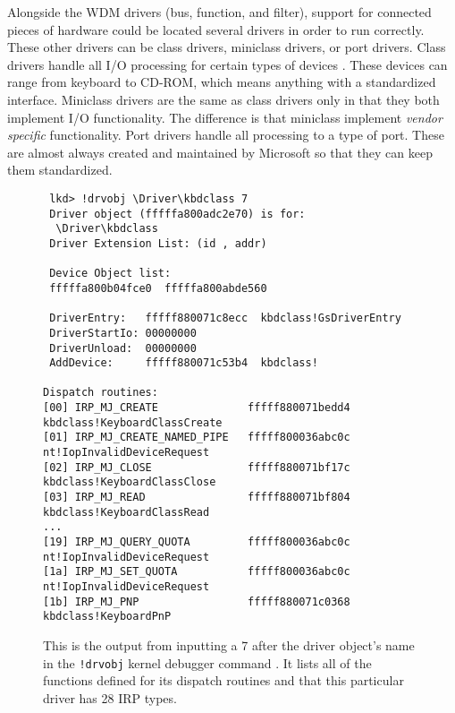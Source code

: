 \documentclass[10pt,draftclsnofoot,onecolumn]{IEEEtran}
\begin{document}
\par Alongside the WDM drivers (bus, function, and filter), support for connected pieces of hardware could be located several drivers in order to run correctly.
These other drivers can be class drivers, miniclass drivers, or port drivers.
Class drivers handle all I/O processing for certain types of devices \cite{win:2}.
These devices can range from keyboard to CD-ROM, which means anything with a standardized interface.
Miniclass drivers are the same as class drivers only in that they both implement I/O functionality.
The difference is that miniclass implement \textit{vendor specific} functionality.
Port drivers handle all processing to a type of port.
These are almost always created and maintained by Microsoft so that they can keep them standardized.

\begin{figure}[h]
\begin{lstlisting}
 lkd> !drvobj \Driver\kbdclass 7
 Driver object (fffffa800adc2e70) is for:
  \Driver\kbdclass
 Driver Extension List: (id , addr)

 Device Object list:
 fffffa800b04fce0  fffffa800abde560

 DriverEntry:   fffff880071c8ecc  kbdclass!GsDriverEntry
 DriverStartIo: 00000000
 DriverUnload:  00000000
 AddDevice:     fffff880071c53b4  kbdclass!

Dispatch routines:
[00] IRP_MJ_CREATE              fffff880071bedd4  kbdclass!KeyboardClassCreate
[01] IRP_MJ_CREATE_NAMED_PIPE   fffff800036abc0c  nt!IopInvalidDeviceRequest
[02] IRP_MJ_CLOSE               fffff880071bf17c  kbdclass!KeyboardClassClose
[03] IRP_MJ_READ                fffff880071bf804  kbdclass!KeyboardClassRead
...
[19] IRP_MJ_QUERY_QUOTA         fffff800036abc0c  nt!IopInvalidDeviceRequest
[1a] IRP_MJ_SET_QUOTA           fffff800036abc0c  nt!IopInvalidDeviceRequest
[1b] IRP_MJ_PNP                 fffff880071c0368  kbdclass!KeyboardPnP
\end{lstlisting}
\centering
\captionsetup{justification=centering}
\caption{
  This is the output from inputting a 7 after the driver object's name in the \texttt{!drvobj} kernel debugger command \cite{win:2}.
  It lists all of the functions defined for its dispatch routines and that this particular driver has 28 IRP types.
}
\label{code:dispatch_routine}
\end{figure}
\end{document}
